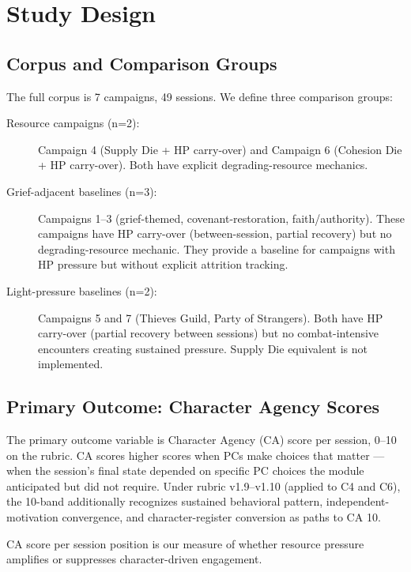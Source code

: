 
\section{Study Design}
\label{sec:study}

\subsection{Corpus and Comparison Groups}

The full corpus is 7 campaigns, 49 sessions. We define three comparison groups:

\begin{description}
  \item[Resource campaigns (n=2):] Campaign 4 (Supply Die + HP carry-over) and Campaign 6
    (Cohesion Die + HP carry-over). Both have explicit degrading-resource mechanics.
  \item[Grief-adjacent baselines (n=3):] Campaigns 1--3 (grief-themed, covenant-restoration,
    faith/authority). These campaigns have HP carry-over (between-session, partial recovery)
    but no degrading-resource mechanic. They provide a baseline for campaigns with HP
    pressure but without explicit attrition tracking.
  \item[Light-pressure baselines (n=2):] Campaigns 5 and 7 (Thieves Guild, Party of Strangers).
    Both have HP carry-over (partial recovery between sessions) but no combat-intensive
    encounters creating sustained pressure. Supply Die equivalent is not implemented.
\end{description}

\subsection{Primary Outcome: Character Agency Scores}

The primary outcome variable is Character Agency (CA) score per session, 0--10 on the
rubric. CA scores higher scores when PCs make choices that matter --- when the session's
final state depended on specific PC choices the module anticipated but did not require.
Under rubric v1.9--v1.10 (applied to C4 and C6), the 10-band additionally recognizes
sustained behavioral pattern, independent-motivation convergence, and character-register
conversion as paths to CA 10.

CA score per session position is our measure of whether resource pressure amplifies or
suppresses character-driven engagement.

